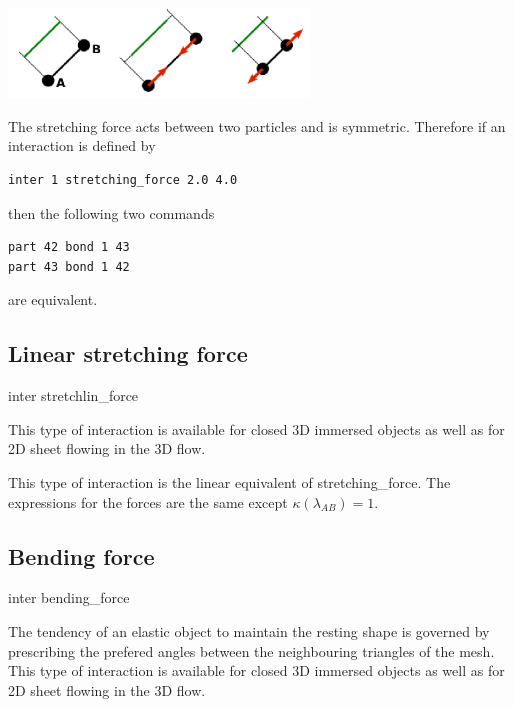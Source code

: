 \begin{center}
  \includegraphics[width=8cm]{figures/stretching.png}
\end{center}
The stretching force acts between two particles and is symmetric. Therefore if an interaction is defined by
\begin{verbatim} 
inter 1 stretching_force 2.0 4.0
\end{verbatim}
then the following two commands
\begin{verbatim} 
part 42 bond 1 43
part 43 bond 1 42
\end{verbatim}
are equivalent.

\subsection{Linear stretching force}

\begin{essyntax}
  inter 
  stretchlin_force
   
\end{essyntax}
This type of interaction is available for closed 3D immersed objects as well as 
for 2D sheet flowing in the 3D flow. 

This type of interaction is the linear equivalent of stretching_force. The expressions for the forces are 
the same except $\kappa(\lambda_{AB}) = 1$. 


\subsection{Bending force}

\begin{essyntax}
  inter 
  bending_force
   
\end{essyntax}

The tendency of an elastic object to maintain the resting shape is governed by 
prescribing the prefered angles between the neighbouring triangles of the mesh. 
This type of interaction is available for closed 3D immersed objects as well as 
for 2D sheet flowing in the 3D flow.


